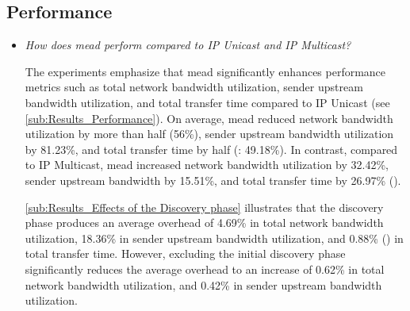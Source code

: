 \subsection{Performance} %
\label{sub:discussion_Performance}
\begin{itemize}
\item[\textit{\rqii{}}]
    \textit{How does \gls{mead} perform compared to IP Unicast and IP Multicast?}
    

    The experiments emphasize that \gls{mead} significantly enhances performance
        metrics such as total network bandwidth utilization, sender upstream
        bandwidth utilization, and total transfer time compared to IP Unicast
        (see \autoref{sub:Results_Performance}).
    On average, \gls{mead} reduced network bandwidth utilization by more than
        half (56\%), sender upstream bandwidth utilization by 81.23\%, and
        total transfer time by half (\ucii{}: 49.18\%).
    In contrast, compared to IP Multicast, \gls{mead} increased network bandwidth
        utilization by 32.42\%, sender upstream bandwidth by 15.51\%, and total
        transfer time by 26.97\% (\ucii{}).

    \autoref{sub:Results_Effects of the Discovery phase} illustrates that the discovery
        phase produces an average overhead of 4.69\% in total network bandwidth
        utilization, 18.36\% in sender upstream bandwidth utilization, and 0.88\%
        (\ucii{}) in total transfer time. %
    However, excluding the initial discovery phase significantly reduces the 
        average overhead to an increase of 0.62\% in total network bandwidth
        utilization, and 0.42\% in sender upstream bandwidth utilization.


\end{itemize}
